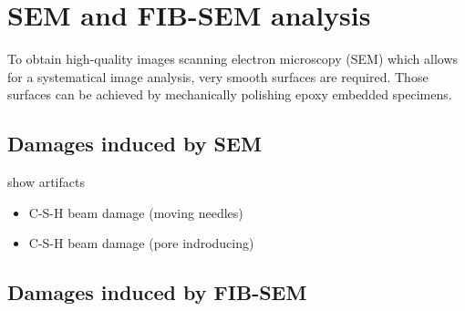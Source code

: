 \chapter{SEM and FIB-SEM analysis}

To obtain high-quality images scanning electron microscopy (SEM) which allows for a systematical image analysis, very smooth surfaces are required.
Those surfaces can be achieved by mechanically polishing epoxy embedded specimens.

\section{Damages induced by SEM}

show artifacts

\begin{itemize}
\item C-S-H beam damage (moving needles)
\item C-S-H beam damage (pore indroducing)
\end{itemize}


\section{Damages induced by FIB-SEM}